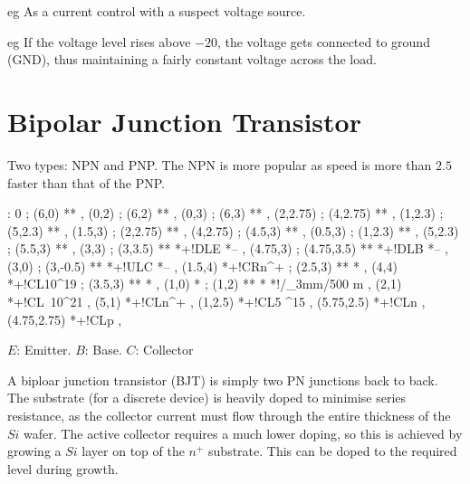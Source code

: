 \documentclass[a4paper,12pt]{article}
\begin{document}
eg As a current control with a suspect voltage source.

\begin{table}[hbtp]


\end{table}

eg If the voltage level rises above $-20$, the voltage gets
connected to ground (GND), thus maintaining a fairly constant voltage
across the load.


\section{Bipolar Junction Transistor}

Two types: NPN and PNP. The NPN is more popular as speed is more than
$2.5$ faster than that of the PNP.

\begin{table}[hbtp]

\xy <1cm,0cm>:
0 ; (6,0) **\dir{-} ,
(0,2) ; (6,2) **\dir{-} ,
(0,3) ; (6,3) **\dir{-} ,
(2,2.75) ; (4,2.75) **\dir{-} ,
(1,2.3) ; (5,2.3) **\dir{-} ,
(1.5,3) ; (2,2.75) ** ,
(4,2.75) ; (4.5,3) ** ,
(0.5,3) ; (1,2.3) ** ,
(5,2.3) ; (5.5,3) ** , 
(3,3) ; (3,3.5) **\dir{-} *+!DL{E} *-- ,
(4.75,3) ; (4.75,3.5) **\dir{-} *+!DL{B} *-- ,
(3,0) ; (3,-0.5) **\dir{-} *+!UL{C} *-- ,
(1.5,4) *+!CR{n^{+}} ; (2.5,3) **\dir{-} *\dir{>} ,
(4,4) *+!CL{10^{19}} ; (3.5,3) **\dir{-} *\dir{>} ,
(1,0) *\dir{<} ; (1,2) **\dir{-} *\dir{>} *!/_3mm/{500 \mu m} ,
(2,1) *+!CL{~10^{21}} ,
(5,1) *+!CL{n^{+}} ,
(1,2.5) *+!CL{5 ^{15}} ,
(5.75,2.5) *+!CL{n} ,
(4.75,2.75) *+!CL{p} ,
\endxy

\caption{$E$: Emitter. $B$: Base. $C$: Collector}

\end{table}

A biploar junction transistor (BJT) is simply two PN junctions
back to back. The substrate (for a discrete device) is heavily doped to
minimise series resistance, as the collector current must flow through
the entire thickness of the $Si$ wafer. The active collector requires a
much lower doping, so this is achieved by growing a $Si$ layer on top of
the $n^{+}$ substrate. This can be doped to the required level during
growth. 
\end{document}
